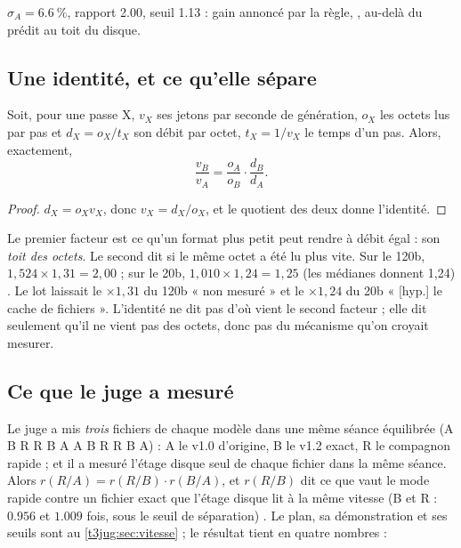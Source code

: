 $\sigma_A = \SI{6.6}{\percent}$, rapport \num{2.00}, seuil \num{1.13} : gain annoncé par la règle, , au-delà du prédit au toit du disque.

\subsection{Une identité, et ce qu'elle sépare}\label{t3sno:sec:b3}

\begin{proposition}\label{t3sno:prop:b3}
Soit, pour une passe X, $v_X$ ses jetons par seconde de génération, $o_X$ les octets lus par pas et $d_X = o_X / t_X$ son débit par octet, $t_X = 1/v_X$ le temps d'un pas. Alors, exactement,
\[
\frac{v_B}{v_A} = \frac{o_A}{o_B} \cdot \frac{d_B}{d_A}.
\]
\end{proposition}
\begin{proof}
$d_X = o_X v_X$, donc $v_X = d_X / o_X$, et le quotient des deux donne l'identité.
\end{proof}

Le premier facteur est ce qu'un format plus petit peut rendre à débit égal : son \emph{toit des octets}. Le second dit si le même octet a été lu plus vite. Sur le 120b, $1{,}524 \times 1{,}31 = 2{,}00$ ; sur le 20b, $1{,}010 \times 1{,}24 = 1{,}25$ (les médianes donnent 1,24) \calc. Le lot laissait le $\times 1{,}31$ du 120b « non mesuré » et le $\times 1{,}24$ du 20b « [hyp.] le cache de fichiers ». L'identité ne dit pas d'où vient le second facteur ; elle dit seulement qu'il ne vient pas des octets, donc pas du mécanisme qu'on croyait mesurer.

\subsection{Ce que le juge a mesuré}\label{t3sno:sec:juge-vitesse}

Le juge a mis \emph{trois} fichiers de chaque modèle dans une même séance équilibrée (A B R R B A A B R R B A) : A le v1.0 d'origine, B le v1.2 exact, R le compagnon rapide ; et il a mesuré l'étage disque seul de chaque fichier dans la même séance. Alors $r(R/A) = r(R/B)\cdot r(B/A)$, et $r(R/B)$ dit ce que vaut le mode rapide contre un fichier exact que l'étage disque lit à la même vitesse (B et R : $\num{0.956}$ et $\num{1.009}$ fois, sous le seuil de séparation) \mes. Le plan, sa démonstration et ses seuils sont au \cref{t3jug:sec:vitesse} ; le résultat tient en quatre nombres :

